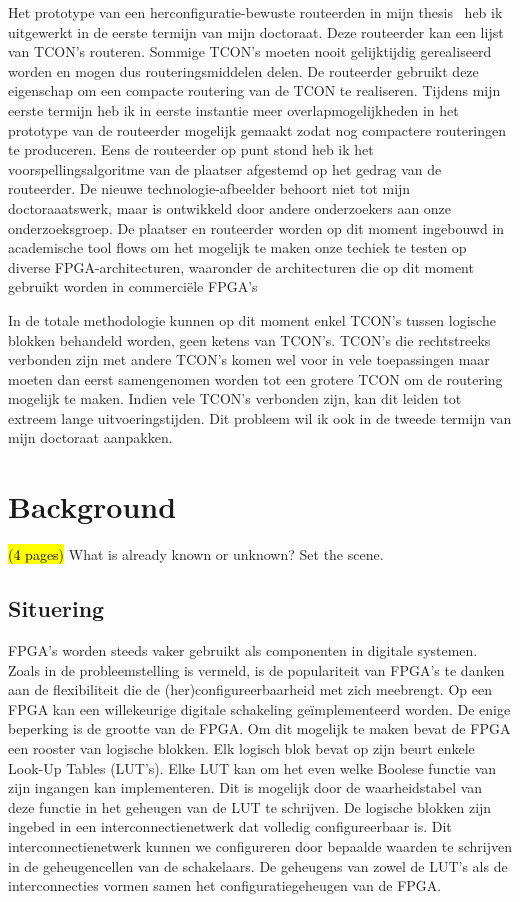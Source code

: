 \documentclass[a4paper,oneside,12pt]{article}
\begin{document}
Het prototype van een herconfiguratie-bewuste routeerden in mijn thesis~\cite{mthesiselias} heb ik uitgewerkt in de eerste termijn van mijn doctoraat. Deze routeerder kan een lijst van TCON's routeren. Sommige TCON's moeten nooit gelijktijdig gerealiseerd worden en mogen dus routeringsmiddelen delen. De routeerder gebruikt deze eigenschap om een compacte routering van de TCON te realiseren. Tijdens mijn eerste termijn heb ik in eerste instantie meer overlapmogelijkheden in het prototype van de routeerder mogelijk gemaakt zodat nog compactere routeringen te produceren. Eens de routeerder op punt stond heb ik het voorspellingsalgoritme van de plaatser afgestemd op het gedrag van de routeerder. De nieuwe technologie-afbeelder behoort niet tot mijn doctoraaatswerk, maar is ontwikkeld door andere onderzoekers aan onze onderzoeksgroep. De plaatser en routeerder worden op dit moment ingebouwd in academische tool flows om het mogelijk te maken onze techiek te testen op diverse FPGA-architecturen, waaronder de architecturen die op dit moment gebruikt worden in commerciële FPGA's

In de totale methodologie kunnen op dit moment enkel TCON's tussen logische blokken behandeld worden, geen ketens van TCON's. TCON's die rechtstreeks verbonden zijn met andere TCON's komen wel voor in vele toepassingen maar moeten dan eerst samengenomen worden tot een grotere TCON om de routering mogelijk te maken. Indien vele TCON's verbonden zijn, kan dit leiden tot extreem lange uitvoeringstijden. Dit probleem wil ik ook in de tweede termijn van mijn doctoraat aanpakken.

\newpage

\section{Background}
\hl{(4 pages)}
What is already known or unknown? Set the scene.

\subsection{Situering}

FPGA's worden steeds vaker gebruikt als componenten in digitale systemen. Zoals in de probleemstelling is vermeld, is de populariteit van FPGA's te danken aan de flexibiliteit die de (her)configureerbaarheid met zich meebrengt. Op een FPGA kan een willekeurige digitale schakeling ge\"implementeerd worden. De enige beperking is de grootte van de FPGA. Om dit mogelijk te maken bevat de FPGA een rooster van logische blokken. Elk logisch blok bevat op zijn beurt enkele Look-Up Tables (LUT's). Elke LUT kan om het even welke Boolese functie van zijn ingangen kan implementeren. Dit is mogelijk door de waarheidstabel van deze functie in het geheugen van de LUT te schrijven. De logische blokken zijn ingebed in een interconnectienetwerk dat volledig configureerbaar is. Dit interconnectienetwerk kunnen we configureren door bepaalde waarden te schrijven in de geheugencellen van de schakelaars. De geheugens van zowel de LUT's als de interconnecties vormen samen het configuratiegeheugen van de FPGA. 
\end{document}
